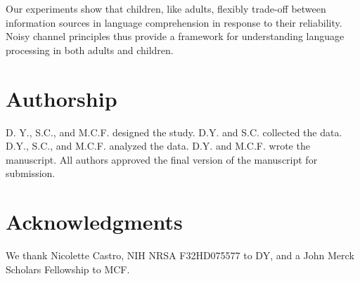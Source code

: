 \documentclass[man,floatsintext]{apa6}
\begin{document}
Our experiments show that children, like adults, flexibly trade-off between information sources in language comprehension in response to their reliability. Noisy channel principles thus provide a framework for understanding language processing in both adults and children.


\section{Authorship}
D. Y., S.C., and M.C.F. designed the study. D.Y. and S.C. collected the data. D.Y., S.C., and M.C.F. analyzed the data. D.Y. and M.C.F. wrote the manuscript. All authors approved the final version of the manuscript for submission.

\section{Acknowledgments}

We thank Nicolette Castro, NIH NRSA F32HD075577 to DY, and a John Merck Scholars Fellowship to MCF.



\end{document}
